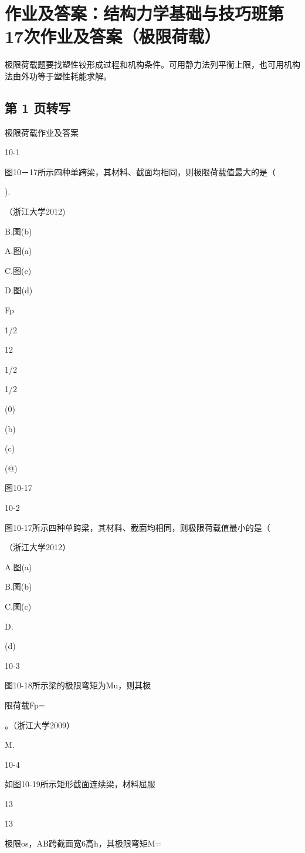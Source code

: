 \section{作业及答案：结构力学基础与技巧班第17次作业及答案（极限荷载）}
\begin{analysisbox}
极限荷载题要找塑性铰形成过程和机构条件。可用静力法列平衡上限，也可用机构法由外功等于塑性耗能求解。
\end{analysisbox}
\subsection*{第 1 页转写}
极限荷载作业及答案

10-1

图10－17所示四种单跨梁，其材料、截面均相同，则极限荷载值最大的是（

).

（浙江大学2012)

B.图(b)

A.图(a)

C.图(c)

D.图(d)

Fp

1/2

12

1/2

1/2

(0)

(b)

(c)

(@)

图10-17

10-2

图10-17所示四种单跨梁，其材料、截面均相同，则极限荷载值最小的是（

（浙江大学2012）

A.图(a)

B.图(b)

C.图(c)

D.

(d)

10-3

图10-18所示梁的极限弯矩为Mu，则其极

限荷载Fp=

。（浙江大学2009）

M.

10-4

如图10-19所示矩形截面连续梁，材料屈服

13

13

极限os，AB跨截面宽6高h，其极限弯矩M=

